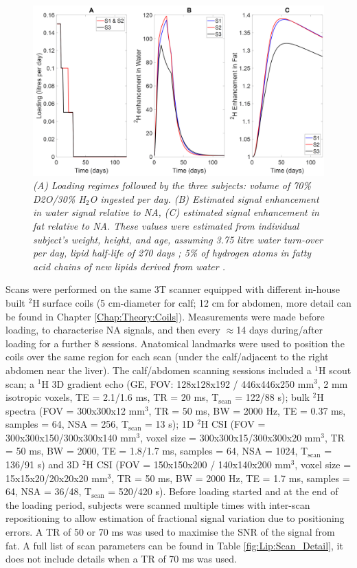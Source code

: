 \begin{figure}
    \centering
    \includegraphics[width=1\textwidth]{Figures/Lipid/Loading_Routine.png}
    \caption{\textit{(A) Loading regimes followed by the three subjects: volume of 70\% D2O/30\% H$_2$O ingested per day. (B) Estimated signal enhancement in water signal relative to NA, (C) estimated signal enhancement in fat relative to NA. These values were estimated from individual subject’s weight, height, and age, assuming 3.75 litre water turn-over per day, lipid half-life of 270 days \cite{Carnethon2002Serum19871998}; 5\% of hydrogen atoms in fatty acid chains of new lipids derived from water \cite{Turner2003MeasurementMIDA}.}}
    \label{fig:Lip:Load}
\end{figure}

Scans were performed on the same 3T scanner equipped with different in-house built $^2$H surface coils (5 cm-diameter for calf; 12 cm for abdomen, more detail can be found in Chapter \ref{Chap:Theory:Coils}). Measurements were made before loading, to characterise \ac{NA} signals, and then every $\approx$14 days during/after loading for a further 8 sessions. Anatomical landmarks were used to position the coils over the same region for each scan (under the calf/adjacent to the right abdomen near the liver). The calf/abdomen scanning sessions included a $^1$H scout scan; a $^1$H 3D gradient echo (\ac{GE}, \ac{FOV}: 128x128x192 / 446x446x250 mm$^3$, 2 mm isotropic voxels, \ac{TE} = 2.1/1.6 ms, TR = 20 ms, T$_\text{scan}$ = 122/88 s); bulk $^2$H spectra (\ac{FOV} = 300x300x12 mm$^3$, \ac{TR} = 50 ms, \ac{BW} = 2000 Hz, \ac{TE} = 0.37 ms, samples = 64, NSA = 256, T$_\text{scan}$ = 13 s); 1D $^2$H \ac{CSI} (\ac{FOV} = 300x300x150/300x300x140 mm$^3$, voxel size = 300x300x15/300x300x20 mm$^3$, \ac{TR} = 50 ms, \ac{BW} = 2000, \ac{TE} = 1.8/1.7 ms, samples = 64, NSA = 1024, T$_\text{scan}$ = 136/91 s) and 3D $^2$H \ac{CSI} (\ac{FOV} = 150x150x200 / 140x140x200 mm$^3$, voxel size = 15x15x20/20x20x20 mm$^3$, TR = 50 ms, \ac{BW} = 2000 Hz, \ac{TE} = 1.7 ms, samples = 64, NSA = 36/48, T$_\text{scan}$ = 520/420 s). Before loading started and at the end of the loading period, subjects were scanned multiple times with inter-scan repositioning to allow estimation of fractional signal variation due to positioning errors. A \ac{TR} of 50 or 70 ms was used to maximise the \ac{SNR} of the signal from fat. A full list of scan parameters can be found in Table \ref{fig:Lip:Scan_Detail}, it does not include details when a \ac{TR} of 70 ms was used.


